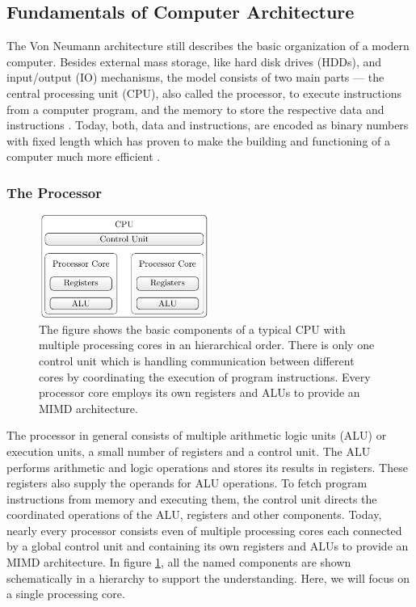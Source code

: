 \documentclass{stdlocal}
\begin{document}
  \subsection{Fundamentals of Computer Architecture}
    The Von Neumann architecture still describes the basic organization of a modern computer.
    Besides external mass storage, like hard disk drives (HDDs), and input/output (IO) mechanisms, the model consists of two main parts --- the central processing unit (CPU), also called the processor, to execute instructions from a computer program, and the memory to store the respective data and instructions \autocite{hennessy2019}.
    Today, both, data and instructions, are encoded as binary numbers with fixed length which has proven to make the building and functioning of a computer much more efficient \autocite{patterson2014}.

    \subsubsection*{The Processor}
    \begin{figure}
      \center
      \includegraphics[width=0.5\textwidth]{figures/cpu_components.pdf}
      \caption[Hierarchical Order of CPU Components]{%
        The figure shows the basic components of a typical CPU with multiple processing cores in an hierarchical order.
        There is only one control unit which is handling communication between different cores by coordinating the execution of program instructions.
        Every processor core employs its own registers and ALUs to provide an MIMD architecture.
      }
      \label{fig:cpu-components}
    \end{figure}
    The processor in general consists of multiple arithmetic logic units (ALU) or execution units, a small number of registers and a control unit.
    The ALU performs arithmetic and logic operations and stores its results in registers.
    These registers also supply the operands for ALU operations.
    To fetch program instructions from memory and executing them, the control unit directs the coordinated operations of the ALU, registers and other components.
    Today, nearly every processor consists even of multiple processing cores each connected by a global control unit and containing its own registers and ALUs to provide an MIMD architecture.
    In figure \ref{fig:cpu-components}, all the named components are shown schematically in a hierarchy to support the understanding.
    Here, we will focus on a single processing core.
\end{document}
